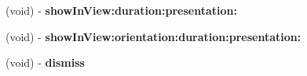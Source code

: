 \begin{DoxyCompactItemize}
\item 
\hypertarget{interface_t_x_s_a_d_view_ex_ad90f68b8b43016c790986e8bbabe60d5}{}(void) -\/ {\bfseries show\+In\+View\+:duration\+:presentation\+:}\label{interface_t_x_s_a_d_view_ex_ad90f68b8b43016c790986e8bbabe60d5}

\item 
\hypertarget{interface_t_x_s_a_d_view_ex_a13438b652c5d64183ff20888a4e323f1}{}(void) -\/ {\bfseries show\+In\+View\+:orientation\+:duration\+:presentation\+:}\label{interface_t_x_s_a_d_view_ex_a13438b652c5d64183ff20888a4e323f1}

\item 
\hypertarget{interface_t_x_s_a_d_view_ex_aa7d5a83eb58411a3ee5dcc54f9beabee}{}(void) -\/ {\bfseries dismiss}\label{interface_t_x_s_a_d_view_ex_aa7d5a83eb58411a3ee5dcc54f9beabee}

\end{DoxyCompactItemize}
